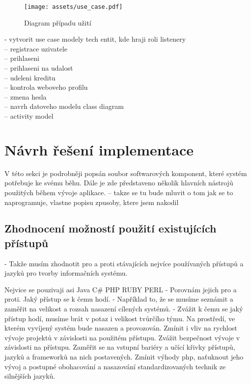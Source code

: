 \documentclass[11pt,oneside]{fithesis}
\begin{document}
            \begin{figure}
                \centering
                \mbox{\texttt{[image: assets/use\_case.pdf]}}
                \caption{Diagram případu užití \label{use-case}}
            \end{figure}

            - vytvorit use case modely tech entit, kde hraji roli listenery\\
                -- registrace uzivatele\\
                -- prihlaseni\\
                -- prihlaseni na udalost\\
                -- udeleni kreditu\\
                -- kontrola weboveho profilu\\
                -- zmena hesla\\
            -- navrh datoveho modelu class diagram\\
            -- activity model\\

        \section{Návrh řešení implementace}
        V této sekci je podrobněji popsán soubor softwarových komponent, které systém potřebuje ke svému běhu. Dále je zde představeno několik hlavních nástrojů použitých během vývoje aplikace.
        -- takze se tu bude mluvit o tom jak se to naprogramuje, vlastne popisu zpusoby, ktere jsem nakodil\\

                \subsection{Zhodnocení možností použití existujících přístupů}
                - Takže musím zhodnotit pro a proti stávajících nejvíce používaných přístupů a jazyků pro tvorby informačních systému.

                Nejvice se pouzivaji asi Java C\# PHP RUBY PERL
                - Porovnám jejich pro a proti. Jaký přístup se k čemu hodí.
                - Například to, že se musíme seznámit a zaměřit na velikost a rozsah nasazení cílených systémů.
                - Zvážit k čemu se jaký přístup hodí, musíme brát v potaz i velikost tvůrčího týmu. Na prostředí, ve kterém vyvíjený systém bude nasazen a provozován. Zmínit i vliv na rychlost vývoje projektů v závislosti na použitém přístupu. Zvážit bezpečnost vývoje v závislosti na přístupu. Zaměřit se na vstupní bariéry a učící křivky přístupů, jazyků a frameworků na nich postavených. Zmínit výhody php, naťuknout jeho vývoj a postupné obohacování a nasazování standardizovaných technik ze silnějších jazyků. 
\end{document}
